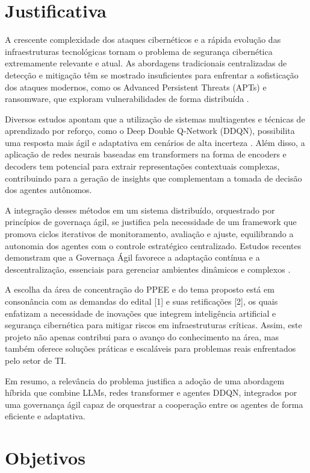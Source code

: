 \documentclass[article,12pt,a4paper]{abntex2}
\begin{document}
\section{Justificativa}
A crescente complexidade dos ataques cibernéticos e a rápida evolução das infraestruturas tecnológicas tornam o problema de segurança cibernética extremamente relevante e atual. As abordagens tradicionais centralizadas de detecção e mitigação têm se mostrado insuficientes para enfrentar a sofisticação dos ataques modernos, como os Advanced Persistent Threats (APTs) e ransomware, que exploram vulnerabilidades de forma distribuída \cite{CostaMartins2019,Mandiant2019}.

Diversos estudos apontam que a utilização de sistemas multiagentes e técnicas de aprendizado por reforço, como o Deep Double Q-Network (DDQN), possibilita uma resposta mais ágil e adaptativa em cenários de alta incerteza \cite{hasselt2016, suttonbarto2018}. Além disso, a aplicação de redes neurais baseadas em transformers na forma de encoders e decoders tem potencial para extrair representações contextuais complexas, contribuindo para a geração de insights que complementam a tomada de decisão dos agentes autônomos.

A integração desses métodos em um sistema distribuído, orquestrado por princípios de governaça ágil, se justifica pela necessidade de um framework que promova ciclos iterativos de monitoramento, avaliação e ajuste, equilibrando a autonomia dos agentes com o controle estratégico centralizado. Estudos recentes demonstram que a Governaça Ágil favorece a adaptação contínua e a descentralização, essenciais para gerenciar ambientes dinâmicos e complexos \cite{agilegov2020, agilegov2021}.

A escolha da área de concentração do PPEE e do tema proposto está em consonância com as demandas do edital [1] e suas retificações [2], os quais enfatizam a necessidade de inovações que integrem inteligência artificial e segurança cibernética para mitigar riscos em infraestruturas críticas. Assim, este projeto não apenas contribui para o avanço do conhecimento na área, mas também oferece soluções práticas e escaláveis para problemas reais enfrentados pelo setor de TI.

Em resumo, a relevância do problema justifica a adoção de uma abordagem híbrida que combine LLMs, redes transformer e agentes DDQN, integrados por uma governança ágil capaz de orquestrar a cooperação entre os agentes de forma eficiente e adaptativa.

\section{Objetivos}
\end{document}
